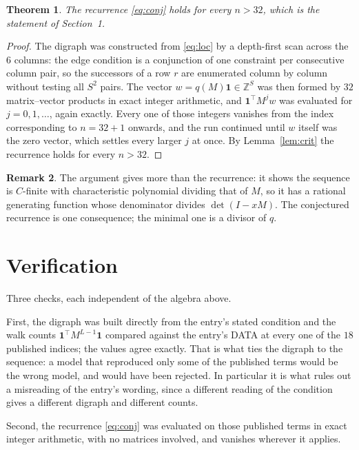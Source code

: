 \documentclass[11pt,a4paper]{article}
\theoremstyle{plain}
\newtheorem{theorem}{Theorem}
\theoremstyle{definition}
\newtheorem{remark}[theorem]{Remark}
\begin{document}
\begin{theorem}
The recurrence \eqref{eq:conj} holds for every $n>32$, which is the statement of
Section~1.
\end{theorem}

\begin{proof}
The digraph was constructed from \eqref{eq:loc} by a depth-first scan across the $6$
columns: the edge condition is a conjunction of one constraint per consecutive column
pair, so the successors of a row $r$ are enumerated column by column without testing all
$S^2$ pairs. The vector $w=q(M)\mathbf{1}\in\mathbb{Z}^{S}$ was then formed by $32$
matrix--vector products in exact integer arithmetic, and $\mathbf{1}^{\!\top}M^{j}w$ was
evaluated for $j=0,1,\dots$, again exactly. Every one of those integers vanishes from the
index corresponding to $n=32+1$ onwards, and the run continued until $w$ itself was the
zero vector, which settles every larger $j$ at once. By Lemma~\ref{lem:crit} the recurrence
holds for every $n>32$.
\end{proof}

\begin{remark}
The argument gives more than the recurrence: it shows the sequence is $C$-finite with
characteristic polynomial dividing that of $M$, so it has a rational generating function
whose denominator divides $\det(I-xM)$. The conjectured recurrence is one consequence; the
minimal one is a divisor of $q$.
\end{remark}

\section{Verification}

Three checks, each independent of the algebra above.

First, the digraph was built directly from the entry's stated condition and the walk counts
$\mathbf{1}^{\!\top}M^{L-1}\mathbf{1}$ compared against the entry's DATA at
every one of the $18$ published indices; the values agree exactly. That is what ties
the digraph to the sequence: a model that reproduced only some of the published terms would
be the wrong model, and would have been rejected. In particular it is what rules out a
misreading of the entry's wording, since a different reading of the condition gives a
different digraph and different counts.

Second, the recurrence \eqref{eq:conj} was evaluated on those published terms in exact
integer arithmetic, with no matrices involved, and vanishes wherever it applies.
\end{document}
